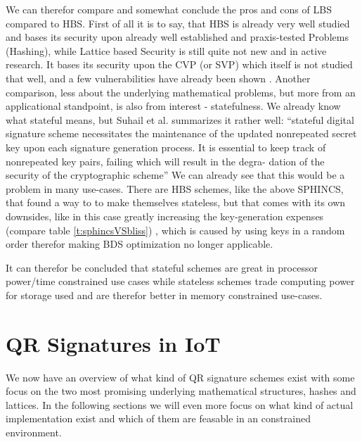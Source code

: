 \documentclass[conference]{IEEEtran}
\begin{document}
We can therefor compare and somewhat conclude the pros and cons of LBS compared to HBS.
First of all it is to say, that HBS is already very well studied and bases its security upon already well established and praxis-tested Problems (Hashing), while Lattice based Security is still quite not new and in active research. It bases its security upon the CVP (or SVP) which itself is not studied that well, and a few vulnerabilities have already been shown \cite{QR_sigs}.
Another comparison, less about the underlying mathematical problems, but more from an applicational standpoint, is also from interest - statefulness.
We already know what stateful means, but Suhail et al. summarizes it rather well: 
``stateful digital signature scheme necessitates the maintenance of the updated nonrepeated secret key upon each signature generation process. It is essential to keep track of nonrepeated key pairs, failing which will result in the degra- dation of the security of the cryptographic scheme'' 
We can already see that this would be a problem in many use-cases.
There are HBS schemes, like the above SPHINCS, that found a way to to make themselves stateless, but that comes with its own downsides, like in this case greatly increasing the key-generation expenses (compare table \ref{t:sphincsVSbliss}) , which is caused by using keys in a random order therefor making BDS optimization no longer applicable. %

It can therefor be concluded that stateful schemes are great in processor power/time constrained use cases while stateless schemes trade computing power for storage used and are therefor better in memory constrained use-cases. \cite{QR_sigs}

\section{QR Signatures in IoT}

We now have an overview of what kind of QR signature schemes exist with some focus on the two most promising underlying mathematical structures, hashes and lattices. In the following sections we will even more focus on what kind of actual implementation exist and which of them are feasable in an constrained environment.
\end{document}
